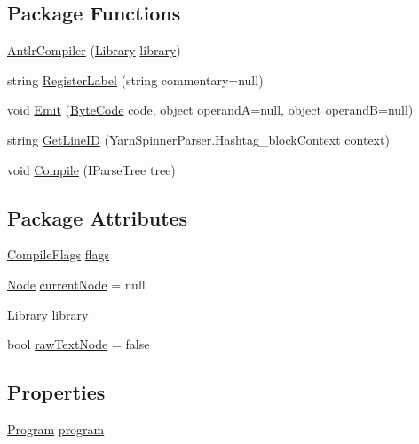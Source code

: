 \subsection*{Package Functions}
\begin{DoxyCompactItemize}
\item 
\hyperlink{a00038_a259b21fcc16b1ff281eab981922524d6}{Antlr\-Compiler} (\hyperlink{a00129}{Library} \hyperlink{a00038_ab324c10fd8e6a786d97a9e5d65547820}{library})
\item 
string \hyperlink{a00038_a80265c0248b66e49b57f8859667f556a}{Register\-Label} (string commentary=null)
\item 
void \hyperlink{a00038_a64d113a28c9352d61064a4bb9fea2016}{Emit} (\hyperlink{a00051_ad5dfb6ee68ca7469623ad3e459f98894}{Byte\-Code} code, object operand\-A=null, object operand\-B=null)
\item 
string \hyperlink{a00038_a6de951c434a183fec46d912a535f5d75}{Get\-Line\-I\-D} (Yarn\-Spinner\-Parser.\-Hashtag\-\_\-block\-Context context)
\item 
void \hyperlink{a00038_af1da7b2b9b5827b165cd21101b5c67ce}{Compile} (I\-Parse\-Tree tree)
\end{DoxyCompactItemize}
\subsection*{Package Attributes}
\begin{DoxyCompactItemize}
\item 
\hyperlink{a00038_a00374}{Compile\-Flags} \hyperlink{a00038_aeba873449ff9fb1c6d731ff7eb25f0a0}{flags}
\item 
\hyperlink{a00051_a00379}{Node} \hyperlink{a00038_a4368867242f493938cd6a52fe0e487b6}{current\-Node} = null
\item 
\hyperlink{a00129}{Library} \hyperlink{a00038_ab324c10fd8e6a786d97a9e5d65547820}{library}
\item 
bool \hyperlink{a00038_ac72e8a2a8207103d34b3d564e78fae93}{raw\-Text\-Node} = false
\end{DoxyCompactItemize}
\subsection*{Properties}
\begin{DoxyCompactItemize}
\item 
\hyperlink{a00152}{Program} \hyperlink{a00038_aa30773708afdaeded2e85e6c8a8e041e}{program}
\end{DoxyCompactItemize}
